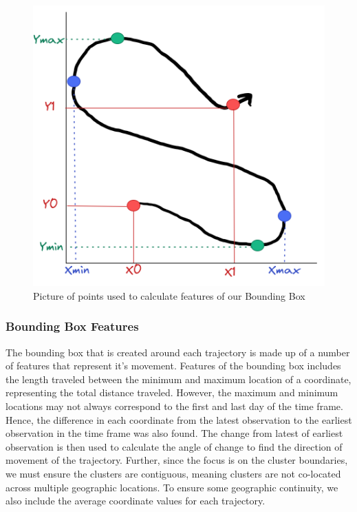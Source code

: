 \documentclass[12pt]{article}
\begin{document}
\begin{figure}[tbp]

{\centering \includegraphics[width=0.8\linewidth,]{images/bounding-box} 

}

\caption[Bounding Example]{Picture of points used to calculate features of our Bounding Box}\label{fig:bb-pic}
\end{figure}

\hypertarget{bounding-box-features}{%
\subsubsection{Bounding Box Features}\label{bounding-box-features}}

The bounding box that is created around each trajectory is made up of a
number of features that represent it's movement. Features of the
bounding box includes the length traveled between the minimum and
maximum location of a coordinate, representing the total distance
traveled. However, the maximum and minimum locations may not always
correspond to the first and last day of the time frame. Hence, the
difference in each coordinate from the latest observation to the
earliest observation in the time frame was also found. The change from
latest of earliest observation is then used to calculate the angle of
change to find the direction of movement of the trajectory. Further,
since the focus is on the cluster boundaries, we must ensure the
clusters are contiguous, meaning clusters are not co-located across
multiple geographic locations. To ensure some geographic continuity, we
also include the average coordinate values for each trajectory.
\end{document}
